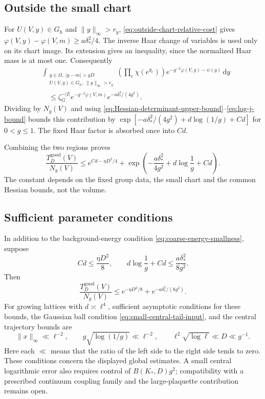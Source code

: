 \documentclass[10pt,reqno]{amsart}
\theoremstyle{definition}
\theoremstyle{remark}
\numberwithin{equation}{section}
\numberwithin{figure}{section}
\newcommand{\dd}{\mathrm d}
\begin{document}
\subsection{Outside the small chart}
For $U(V,y)\in G_h$ and $\|y\|_\infty>r_y$,
\eqref{eq:outside-chart-relative-cost} gives
$\varphi(V,y)-\varphi(V,m)\ge a\delta_*^2/4$.
The inverse Haar change of variables is used only on its chart image.
Its extension gives an inequality, since the normalized Haar mass is
at most one. Consequently
\begin{equation}\label{eq:good-tail-outside-chart-bound}
\begin{aligned}
&\int_{\substack{y\in\Omega,\ |y-m|>gD\\
 U(V,y)\in G_h,\ \|y\|_\infty>r_y}}
\left(\prod_e\chi(e^{y_e})\right)
e^{-g^{-2}\varphi(V,y)-\psi(y)}\,\dd y\\
&\quad\le\zeta_G^{-|I|}e^{-g^{-2}\varphi(V,m)}
e^{-a\delta_*^2/(4g^2)}.
\end{aligned}
\end{equation}
Dividing by $N_g(V)$ and using
\eqref{eq:Hessian-determinant-upper-bound}--\eqref{eq:log-j-bound}
bounds this contribution by
$\exp[-a\delta_*^2/(4g^2)+d\log(1/g)+Cd]$ for $0<g\le1$.
The fixed Haar factor is absorbed once into $Cd$.

Combining the two regions proves
\begin{equation}\label{eq:good-tail-two-term-bound}
\boxed{\frac{T_D^{\mathrm{good}}(V)}{N_g(V)}
\le e^{Cd-\eta D^2/4}
+\exp\left(-\frac{a\delta_*^2}{4g^2}+d\log\frac1g+Cd\right).}
\end{equation}
The constant depends on the fixed group data, the small chart and the
common Hessian bounds, not the volume.

\subsection{Sufficient parameter conditions}
In addition to the background-energy condition
\eqref{eq:coarse-energy-smallness}, suppose
\begin{equation}\label{eq:good-tail-improved-conditions}
Cd\le\frac{\eta D^2}{8},\qquad
d\log\frac1g+Cd\le\frac{a\delta_*^2}{8g^2}.
\end{equation}
Then
\begin{equation}\label{eq:good-tail-final-bound}
\boxed{\frac{T_D^{\mathrm{good}}(V)}{N_g(V)}
\le e^{-\eta D^2/8}+e^{-a\delta_*^2/(8g^2)}.}
\end{equation}
For growing lattices with $d\asymp\ell^4$, sufficient asymptotic
conditions for these bounds, the Gaussian ball condition
\eqref{eq:small-central-tail-input}, and the central trajectory bounds
are
\begin{equation}\label{eq:sufficient-global-parameter-regime}
\|x\|_\infty\ll\ell^{-2},\qquad
g\sqrt{\log(1/g)}\ll\ell^{-2},\qquad
\ell^2\sqrt{\log\ell}\ll D\ll g^{-1}.
\end{equation}
Here each $\ll$ means that the ratio of the left side to the right
side tends to zero. These conditions concern the displayed global
estimates. A small central logarithmic error also requires control of
$B(K_*,D)g^2$; compatibility with a prescribed continuum coupling
family and the large-plaquette contribution remains open.
\end{document}
